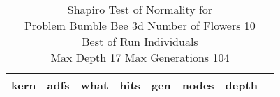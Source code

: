 \begin{table}[H]
\caption{Shapiro Test of Normality for \\ Problem  Bumble Bee 3d  Number of Flowers 10\\Best of Run Individuals \\ Max Depth 17 Max Generations 104\\}
\begin{center}
\scalebox{0.8} %
{
\begin{tabular}{lrrrrrrr}
\hline
kern & adfs & what & hits & gen & nodes & depth \\
\hline


\end{tabular}
}
\end{center}
\end{table}

